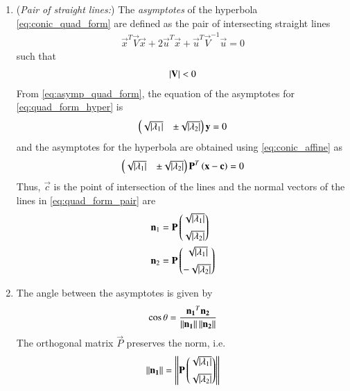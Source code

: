 \begin{enumerate}[label=\thesubsection.\arabic*.,ref=\thesubsection.\theenumi]
\item ({\em Pair of straight lines:}) The {\em asymptotes} of the hyperbola \eqref{eq:conic_quad_form} are defined as the pair of intersecting straight lines 
\begin{align}
\label{eq:asymp_quad_form}
\vec{x}^T\vec{V}\vec{x}+2\vec{u}^T\vec{x}+\vec{u}^T\vec{V}^{-1}\vec{u}=0
\end{align}
such that 
\begin{align} 
\left\vert\mathbf{V}\right\vert < 0
\label{eq:quad_pair_det}
\end{align} 
%
From \eqref{eq:asymp_quad_form},
%
the equation of the asymptotes for \eqref{eq:quad_form_hyper} is
\begin{align} 
\begin{pmatrix}\sqrt{\left\vert\lambda_1\right\vert} & \pm \sqrt{\left\vert\lambda_2\right\vert}\end{pmatrix}\mathbf{y} = 0
\end{align} 
%
and the asymptotes for the hyperbola are obtained using \eqref{eq:conic_affine} as
%
\begin{align} 
\label{eq:quad_form_pair}
\begin{pmatrix}\sqrt{\left\vert\lambda_1\right\vert} & \pm \sqrt{\left\vert\lambda_2\right\vert}\end{pmatrix}\mathbf{P}^T\left(\mathbf{x}-\mathbf{c}\right) = 0
\end{align} 
%
Thus, $\vec{c}$ is the point of intersection of the lines and the normal vectors of the lines in \eqref{eq:quad_form_pair} are 
\begin{align} 
\label{eq:quad_form_pair_normvecs}
\begin{split}
\mathbf{n}_1 &= \mathbf{P}\begin{pmatrix}\sqrt{\left\vert\lambda_1\right\vert} \\[2mm]  \sqrt{\left\vert\lambda_2\right\vert}\end{pmatrix}
\\
\mathbf{n}_2 &= \mathbf{P}\begin{pmatrix}\sqrt{\left\vert\lambda_1\right\vert} \\[2mm] - \sqrt{\left\vert\lambda_2\right\vert}\end{pmatrix}
\end{split}
\end{align} 
%
\item The angle between the asymptotes is given by 
\begin{align} 
\label{eq:quad_form_pair_ang_exp}
\cos\theta=\frac{\mathbf{n_1}^T\mathbf{n_2}}{\left\lVert\mathbf{n_1}\right\rVert\left\lVert\mathbf{n_2}\right\rVert}
\end{align} 
The orthogonal matrix $\vec{P}$ preserves the norm, i.e.
\begin{align} 
\norm{\vec{n_1}} = \norm{\vec{P}\myvec{\sqrt{\abs{\lambda_1}} \\[2mm]  \sqrt{\abs{\lambda_2}}}}
\\

\end{align}
\end{enumerate}
